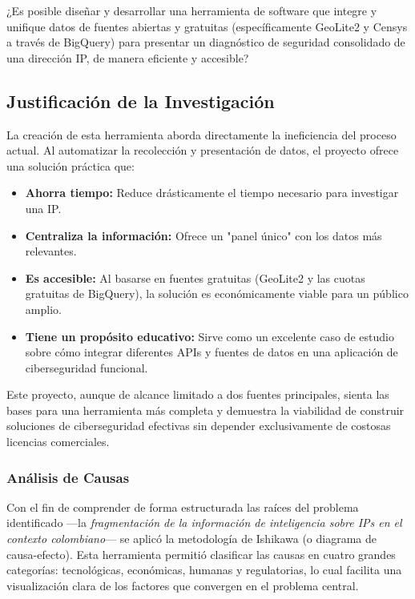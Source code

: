 ¿Es posible diseñar y desarrollar una herramienta de software que integre y unifique datos de fuentes abiertas y gratuitas (específicamente GeoLite2 y Censys a través de BigQuery) para presentar un diagnóstico de seguridad consolidado de una dirección IP, de manera eficiente y accesible?

\subsection{Justificación de la Investigación}

La creación de esta herramienta aborda directamente la ineficiencia del proceso actual. Al automatizar la recolección y presentación de datos, el proyecto ofrece una solución práctica que:
\begin{itemize}
    \item \textbf{Ahorra tiempo:} Reduce drásticamente el tiempo necesario para investigar una IP.
    \item \textbf{Centraliza la información:} Ofrece un "panel único" con los datos más relevantes.
    \item \textbf{Es accesible:} Al basarse en fuentes gratuitas (GeoLite2 y las cuotas gratuitas de BigQuery), la solución es económicamente viable para un público amplio.
    \item \textbf{Tiene un propósito educativo:} Sirve como un excelente caso de estudio sobre cómo integrar diferentes APIs y fuentes de datos en una aplicación de ciberseguridad funcional.
\end{itemize}

Este proyecto, aunque de alcance limitado a dos fuentes principales, sienta las bases para una herramienta más completa y demuestra la viabilidad de construir soluciones de ciberseguridad efectivas sin depender exclusivamente de costosas licencias comerciales.

\subsubsection{Análisis de Causas}
Con el fin de comprender de forma estructurada las raíces del problema identificado ---la \textit{fragmentación de la información de inteligencia sobre IPs en el contexto colombiano}--- se aplicó la metodología de Ishikawa (o diagrama de causa-efecto). Esta herramienta permitió clasificar las causas en cuatro grandes categorías: tecnológicas, económicas, humanas y regulatorias, lo cual facilita una visualización clara de los factores que convergen en el problema central.

